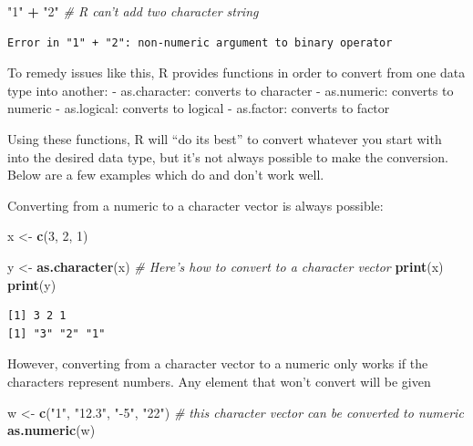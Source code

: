 \documentclass[
]{article}
\newenvironment{Shaded}{\begin{snugshade}}{\end{snugshade}}
\newcommand{\CommentTok}[1]{\textcolor[rgb]{0.56,0.35,0.01}{\textit{#1}}}
\newcommand{\DecValTok}[1]{\textcolor[rgb]{0.00,0.00,0.81}{#1}}
\newcommand{\KeywordTok}[1]{\textcolor[rgb]{0.13,0.29,0.53}{\textbf{#1}}}
\newcommand{\NormalTok}[1]{#1}
\newcommand{\OperatorTok}[1]{\textcolor[rgb]{0.81,0.36,0.00}{\textbf{#1}}}
\newcommand{\StringTok}[1]{\textcolor[rgb]{0.31,0.60,0.02}{#1}}
\begin{document}
\begin{Shaded}
\begin{Highlighting}[]
\StringTok{"1"} \OperatorTok{+}\StringTok{ "2"}   \CommentTok{# R can't add two character string}
\end{Highlighting}
\end{Shaded}

\begin{verbatim}
Error in "1" + "2": non-numeric argument to binary operator
\end{verbatim}

To remedy issues like this, R provides functions in order to convert from one data type into another:
- as.character: converts to character
- as.numeric: converts to numeric
- as.logical: converts to logical
- as.factor: converts to factor

Using these functions, R will ``do its best'' to convert whatever you start with into the desired data type, but it's not always possible to make the conversion.
Below are a few examples which do and don't work well.

Converting from a numeric to a character vector is always possible:

\begin{Shaded}
\begin{Highlighting}[]
\NormalTok{x <-}\StringTok{ }\KeywordTok{c}\NormalTok{(}\DecValTok{3}\NormalTok{, }\DecValTok{2}\NormalTok{, }\DecValTok{1}\NormalTok{)}
\end{Highlighting}
\end{Shaded}

\begin{Shaded}
\begin{Highlighting}[]
\NormalTok{y <-}\StringTok{ }\KeywordTok{as.character}\NormalTok{(x)   }\CommentTok{# Here's how to convert to a character vector}
\KeywordTok{print}\NormalTok{(x)}
\KeywordTok{print}\NormalTok{(y)}
\end{Highlighting}
\end{Shaded}

\begin{verbatim}
[1] 3 2 1
[1] "3" "2" "1"
\end{verbatim}

However, converting from a character vector to a numeric only works if the characters represent numbers.
Any element that won't convert will be given

\begin{Shaded}
\begin{Highlighting}[]
\NormalTok{w <-}\StringTok{ }\KeywordTok{c}\NormalTok{(}\StringTok{"1"}\NormalTok{, }\StringTok{"12.3"}\NormalTok{, }\StringTok{"-5"}\NormalTok{, }\StringTok{"22"}\NormalTok{)   }\CommentTok{# this character vector can be converted to numeric}
\KeywordTok{as.numeric}\NormalTok{(w)}
\end{Highlighting}
\end{Shaded}
\end{document}
